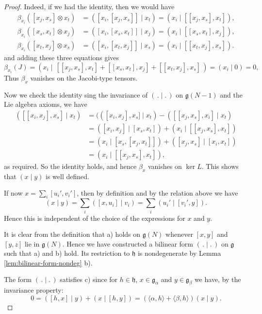\documentclass[12pt]{article}
\begin{document}
\begin{proof}
    Indeed, if we had the identity, then we would have
    \begin{align*}
        \beta_{x_i}([x_j,x_s]\otimes x_t)
         & =([x_i,[x_j,x_s]]\mid x_t)
        =(x_i\mid [[x_j,x_s],x_t]),   \\
        \beta_{x_i}([x_s,x_t]\otimes x_j)
         & =([x_i,[x_s,x_t]]\mid x_j)
        =(x_i\mid [[x_s,x_t],x_j]),   \\
        \beta_{x_i}([x_t,x_j]\otimes x_s)
         & =([x_i,[x_t,x_j]]\mid x_s)
        =(x_i\mid [[x_t,x_j],x_s]).
    \end{align*}
    and adding these three equations gives
    \[
        \beta_{x_i}(J)
        =(x_i\mid \,[[x_j,x_s],x_t]+[[x_s,x_t],x_j]+[[x_t,x_j],x_s]\,)
        = (x_i\mid 0)=0,
    \] Thus $\beta_x$ vanishes on the Jacobi-type tensors.

    Now we check the identity sing the invariance of $(\,.\mid.\,)$ on $\mathfrak{g}(N-1)$ and the Lie algebra axioms, we have
    \begin{align*}
        ([[x_i,x_j],x_s]\mid x_t)
         & = (([x_i,x_j],x_s] \mid x_t) - ([ [x_j,x_s],x_i]\mid x_t) \\
         & = ([x_i,x_j]\mid [x_s,x_t]) + (x_i \mid [[x_j,x_s],x_t])  \\
         & = (x_i \mid [x_s,[x_j,x_t]]) + ([x_j,x_s]\mid [x_i,x_t])  \\
         & = (x_i \mid [[x_j,x_s],x_t]),
    \end{align*}
    as required. So the identity holds, and hence $\beta_x$ vanishes on $\ker L$. This shows that $(x\mid y)$ is well defined.

    If now $x=\sum_i [u_i',v_i']$, then by definition and by the relation above we have
    \[
        (x \mid y) = \sum_i ([x,u_i]\mid v_i)
        = \sum_i (u_i' \mid [v_i',y]).
    \]
    Hence this is independent of the choice of the expressions for $x$ and $y$.

    It is clear from the definition that a) holds on $\mathfrak{g}(N)$ whenever $[x,y]$ and $[y,z]$
    lie in $\mathfrak{g}(N)$. Hence we have constructed a bilinear form $(\,.\mid.\,)$ on $\mathfrak{g}$
    such that a) and b) hold. Its restriction to $\mathfrak{h}$ is nondegenerate by Lemma \ref{lem:bilinear-form-nondeg} b).

    The form $(\,.\mid.\,)$ satisfies c) since for $h \in \mathfrak{h}$, $x \in \mathfrak{g}_\alpha$ and $y \in \mathfrak{g}_\beta$ we have, by the invariance property:
    \[
        0 = ([h,x]\mid y) + (x \mid [h,y])
        = (\langle \alpha,h\rangle + \langle \beta,h\rangle)(x \mid y).
    \]


\end{proof}
\end{document}
